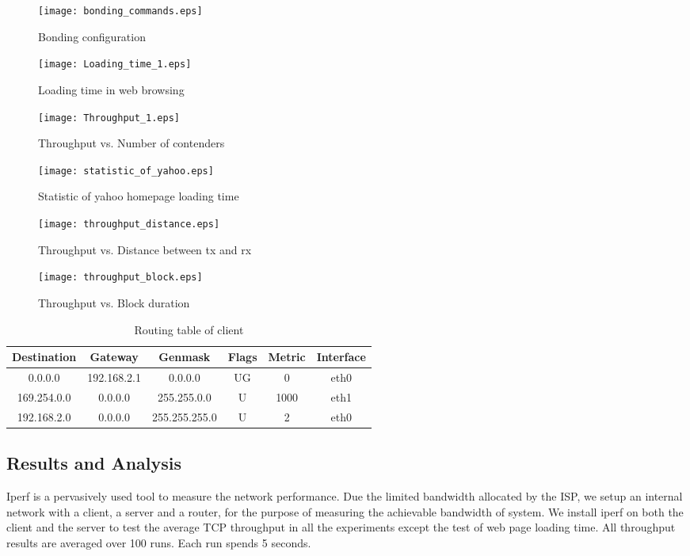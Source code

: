 \documentclass[10pt,journal]{IEEEtran}
\begin{document}
\begin{figure}
\centering
\texttt{[image: bonding\_commands.eps]}
\caption{Bonding configuration}
\label{fig_bonding_commands}
\end{figure}

\begin{figure}
\centering
\texttt{[image: Loading\_time\_1.eps]}
\caption{Loading time in web browsing}
\label{fig_loadtime}
\end{figure}

\begin{figure}
\centering
\texttt{[image: Throughput\_1.eps]}
\caption{Throughput vs. Number of contenders}
\label{fig_throughput}
\end{figure}

\begin{figure}
\centering
\texttt{[image: statistic\_of\_yahoo.eps]}
\caption{Statistic of yahoo homepage loading time}
\label{fig_statistic}
\end{figure}

\begin{figure}
\centering
\texttt{[image: throughput\_distance.eps]}
\caption{Throughput vs. Distance between tx and rx}
\label{fig_distance}
\end{figure}

\begin{figure}
\centering
\texttt{[image: throughput\_block.eps]}
\caption{Throughput vs. Block duration}
\label{fig_block}
\end{figure}

\begin{table}
\centering
\caption{Routing table of client}
\begin{tabular}{|c|c|c|c|c|c|} \hline
Destination&Gateway&Genmask&Flags&Metric&Interface\\ \hline
0.0.0.0&192.168.2.1&0.0.0.0&UG&0&eth0\\ \hline
169.254.0.0&0.0.0.0&255.255.0.0&U&1000&eth1\\ \hline
192.168.2.0&0.0.0.0&255.255.255.0&U&2&eth0\\ \hline
\end{tabular}
\end{table}

\subsection{Results and Analysis}
Iperf \cite{tirumala2005iperf} is a pervasively used tool to measure the network performance. Due the limited bandwidth allocated by the ISP, we setup an internal network with a client, a server and a router, for the purpose of measuring the achievable bandwidth of system. We install iperf on both the client and the server to test the average TCP throughput in all the experiments except the test of web page loading time. All throughput results are averaged over 100 runs. Each run spends 5 seconds.
\end{document}

